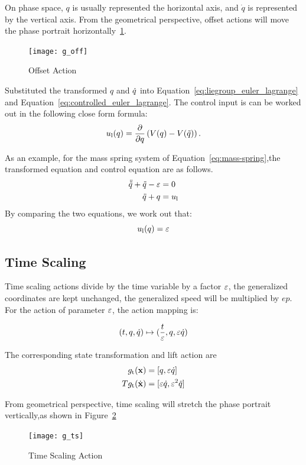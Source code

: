 On phase space,  $q$ is usually represented the horizontal axis, and $\dot{q}$ is represented by the vertical axis.
From the geometrical perspective, offset actions will move the phase portrait horizontally~\ref{fig:goff}.

\begin{figure}[!htbp]
  \begin{center}
      \texttt{[image: g\_off]}
    \caption{Offset Action}
    \label{fig:goff}
\end{center}
\end{figure}

Substituted the transformed $q$ and $\dot{q}$ into Equation~\ref{eq:liegroup_euler_lagrange} and Equation~\ref{eq:controlled_euler_lagrange}.
The control input is can be worked out in the following close form formula:
\begin{equation}
u_{\mathrm{l}}(q) = \frac{\partial}{\partial q} \left(V(q)-V(\tilde{q}) \right).
\end{equation}

As an example, for the mass spring system of Equation~\ref{eq:mass-spring},the transformed equation  and control equation are as follows.
\begin{align}
\ddot{\tilde{q}}+\tilde{q}-\varepsilon&=0 \nonumber \\
\ddot{q}+q&=u_{\mathrm{l}} \nonumber
\end{align}
By comparing the two equations, we work out that:
\[
u_{\mathrm{l}}(q)=\varepsilon
\]




\subsection*{Time Scaling}

Time scaling actions divide by the time variable by a factor $\varepsilon$, the generalized coordinates are kept unchanged, the generalized speed will be multiplied by $ep$.
For the action of parameter $\varepsilon$, the action mapping is: 


\[
(t,q,\dot{q}) \mapsto (\frac{t}{\varepsilon},q,\varepsilon \dot{q})
\]

The corresponding state transformation and lift action are
\begin{align}
g_{\mathrm{t}}(\mathbf{x})&=[q,\varepsilon \dot{q}] \nonumber \\
Tg_{\mathrm{t}}(\dot{\mathbf{x}})&=[\varepsilon \dot{q},\varepsilon^2 \ddot{q}]\nonumber
\end{align}

From geometrical perspective, time scaling will stretch the phase portrait vertically,as shown in Figure~\ref{fig:gts}
\begin{figure}[!htbp]
  \begin{center}
    \texttt{[image: g\_ts]}
	 \caption{Time Scaling Action}
    \label{fig:gts}
\end{center}
\end{figure}

